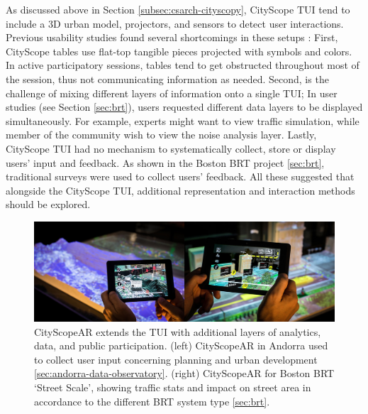 {{      {
          As discussed above in Section \eqref{subsec:csarch-cityscopy}, CityScope TUI tend to include a 3D urban model, projectors, and sensors to detect user interactions. Previous usability studies found several shortcomings in these setups \cite{Noyman2015power, Alrashed2015}: First, CityScope tables use flat-top tangible pieces projected with symbols and colors. In active participatory sessions, tables tend to get obstructed throughout most of the session, thus not communicating information as needed. Second, is the challenge of mixing different layers of information onto a single TUI; In user studies (see Section \eqref{sec:brt}), users requested different data layers to be displayed simultaneously. For example, experts might want to view traffic simulation, while member of the community wish to view the noise analysis layer. Lastly, CityScope TUI had no mechanism to systematically collect, store or display users' input and feedback. As shown in the Boston BRT project \eqref{sec:brt}, traditional surveys were used to collect users' feedback. All these suggested that alongside the CityScope TUI, additional representation and interaction methods should be explored.
      }

      \begin{figure}[!htb]
          \begin{center}
              \includegraphics[width=1\textwidth]{chapters/transformation/cs_arch/figures/ar/ar_2.png}
          \end{center}
          \caption{CityScopeAR extends the TUI with additional layers of analytics, data, and public participation. (left) CityScopeAR in Andorra used to collect user input concerning planning and urban development \eqref{sec:andorra-data-observatory}. (right) CityScopeAR for Boston BRT `Street Scale', showing traffic stats and impact on street area in accordance to the different BRT system type \eqref{sec:brt}.}
          \label{fig:csar_two_examples}
      \end{figure}


}}
